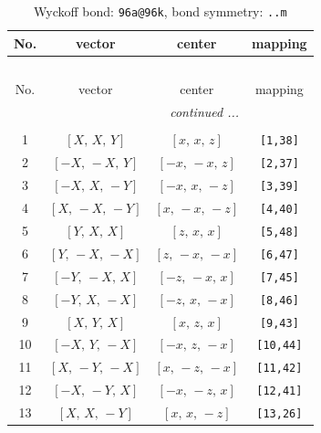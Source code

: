 \documentclass[fleqn,8pt]{jsarticle}
\begin{document}
\begin{longtable}{cccc}
\caption{Wyckoff bond: {\tt 96a@96k}, bond symmetry: {\tt ..m}}
 \\
 \hline \hline
No. & vector & center & mapping \\ \hline \endfirsthead

\multicolumn{3}{l}{\tablename\ \thetable{}} \\
 \hline \hline
No. & vector & center & mapping \\ \hline \endhead

 \hline \hline
\multicolumn{3}{r}{\footnotesize\it continued ...} \\ \endfoot

 \hline \hline
\multicolumn{3}{r}{} \\ \endlastfoot

1 & $\left[ X,\, X,\, Y \right]$ & $\left[ x,\, x,\, z \right]$ & {\tt [1,38]} \\ \hline
2 & $\left[ - X,\, - X,\, Y \right]$ & $\left[ - x,\, - x,\, z \right]$ & {\tt [2,37]} \\ \hline
3 & $\left[ - X,\, X,\, - Y \right]$ & $\left[ - x,\, x,\, - z \right]$ & {\tt [3,39]} \\ \hline
4 & $\left[ X,\, - X,\, - Y \right]$ & $\left[ x,\, - x,\, - z \right]$ & {\tt [4,40]} \\ \hline
5 & $\left[ Y,\, X,\, X \right]$ & $\left[ z,\, x,\, x \right]$ & {\tt [5,48]} \\ \hline
6 & $\left[ Y,\, - X,\, - X \right]$ & $\left[ z,\, - x,\, - x \right]$ & {\tt [6,47]} \\ \hline
7 & $\left[ - Y,\, - X,\, X \right]$ & $\left[ - z,\, - x,\, x \right]$ & {\tt [7,45]} \\ \hline
8 & $\left[ - Y,\, X,\, - X \right]$ & $\left[ - z,\, x,\, - x \right]$ & {\tt [8,46]} \\ \hline
9 & $\left[ X,\, Y,\, X \right]$ & $\left[ x,\, z,\, x \right]$ & {\tt [9,43]} \\ \hline
10 & $\left[ - X,\, Y,\, - X \right]$ & $\left[ - x,\, z,\, - x \right]$ & {\tt [10,44]} \\ \hline
11 & $\left[ X,\, - Y,\, - X \right]$ & $\left[ x,\, - z,\, - x \right]$ & {\tt [11,42]} \\ \hline
12 & $\left[ - X,\, - Y,\, X \right]$ & $\left[ - x,\, - z,\, x \right]$ & {\tt [12,41]} \\ \hline
13 & $\left[ X,\, X,\, - Y \right]$ & $\left[ x,\, x,\, - z \right]$ & {\tt [13,26]} \\ \hline

\end{longtable}
\end{document}
